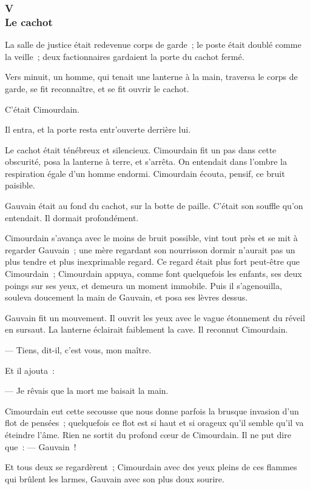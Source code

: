 \documentclass[french,twoside]{book} %
\begin{document}
 \subsubsection[{V. Le cachot}]{V \\
Le cachot}
\label{p3l7c5}
\noindent La salle de justice était redevenue corps de garde ; le poste était doublé comme la veille ; deux factionnaires gardaient la porte du cachot fermé.\par
Vers minuit, un homme, qui tenait une lanterne à la main, traversa le corps de garde, se fit reconnaître, et se fit ouvrir le cachot.\par
C’était Cimourdain.\par
Il entra, et la porte resta entr’ouverte derrière lui.\par
Le cachot était ténébreux et silencieux. Cimourdain fit un pas dans cette obscurité, posa la lanterne à terre, et s’arrêta. On entendait dans l’ombre la respiration égale d’un homme endormi. Cimourdain écouta, pensif, ce bruit paisible.\par
Gauvain était au fond du cachot, sur la botte de paille. C’était son souffle qu’on entendait. Il dormait profondément.\par
Cimourdain s’avança avec le moins de bruit possible, vint tout près et se mit à regarder Gauvain ; une mère regardant son nourrisson dormir n’aurait pas un plus tendre et plus inexprimable regard. Ce regard était plus fort peut-être que Cimourdain ; Cimourdain appuya, comme font quelquefois les enfants,  ses deux poings sur ses yeux, et demeura un moment immobile. Puis il s’agenouilla, souleva doucement la main de Gauvain, et posa ses lèvres dessus.\par
Gauvain fit un mouvement. Il ouvrit les yeux avec le vague étonnement du réveil en sursaut. La lanterne éclairait faiblement la cave. Il reconnut Cimourdain.\par
— Tiens, dit-il, c’est vous, mon maître.\par
Et il ajouta :\par
— Je rêvais que la mort me baisait la main.\par
Cimourdain eut cette secousse que nous donne parfois la brusque invasion d’un flot de pensées ; quelquefois ce flot est si haut et si orageux qu’il semble qu’il va éteindre l’âme. Rien ne sortit du profond cœur de Cimourdain. Il ne put dire que : — Gauvain !\par
Et tous deux se regardèrent ; Cimourdain avec des yeux pleins de ces flammes qui brûlent les larmes, Gauvain avec son plus doux sourire.\par
\end{document}
